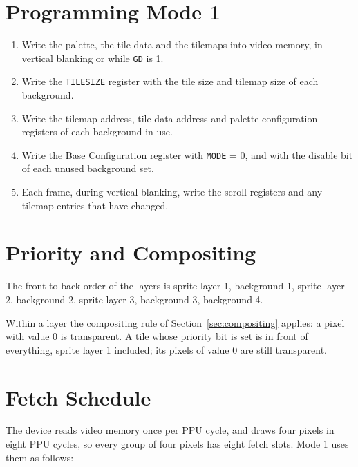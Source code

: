 \section{Programming Mode 1}

\begin{enumerate}
	\item Write the palette, the tile data and the tilemaps into video memory, in vertical blanking or while \texttt{GD} is 1.
	\item Write the \texttt{TILESIZE} register with the tile size and tilemap size of each background.
	\item Write the tilemap address, tile data address and palette configuration registers of each background in use.
	\item Write the Base Configuration register with \texttt{MODE} = 0, and with the disable bit of each unused background set.
	\item Each frame, during vertical blanking, write the scroll registers and any tilemap entries that have changed.
\end{enumerate}

\section{Priority and Compositing}
\label{sec:m1-priority}

The front-to-back order of the layers is sprite layer 1, background 1, sprite layer 2, background 2, sprite layer 3,
background 3, background 4.

Within a layer the compositing rule of Section~\ref{sec:compositing} applies: a pixel with value 0 is transparent. A
tile whose priority bit is set is in front of everything, sprite layer 1 included; its pixels of value 0 are still
transparent.

\section{Fetch Schedule}

The device reads video memory once per PPU cycle, and draws four pixels in eight PPU cycles, so every group of four
pixels has eight fetch slots. Mode 1 uses them as follows:

